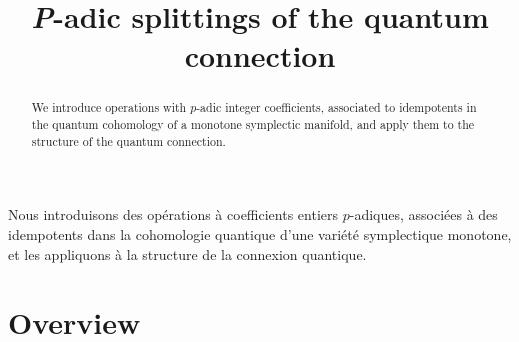 \documentclass[JEP,XML,SOM,Unicode,NoFloatCountersInSection,published]{cedram}
\theoremstyle{plain}
\theoremstyle{definition}
\begin{document}
\frontmatter
\title[$p$-adic splittings of the quantum connection]{{\normalfont\textit{P}}-adic splittings of the quantum connection}

\author[\initial{P.} \lastname{Seidel}]{ }
\address{MIT 2-276,\\
77 Massachusetts Avenue, Cambridge, MA 02139, USA}

\begin{abstract}
We introduce operations with $p$-adic integer coefficients, associated to idempotents in the quantum cohomology of a monotone symplectic manifold, and apply them to the structure of the quantum connection.
\end{abstract}





\begin{altabstract}
Nous introduisons des opérations à coefficients entiers $p$-adiques, associées à des idempotents dans la cohomologie quantique d'une variété symplectique monotone, et les appliquons à la structure de la connexion quantique.
\end{altabstract}

\maketitle
\tableofcontents
\mainmatter

\section{Overview\label{sec:overview}}
\end{document}
